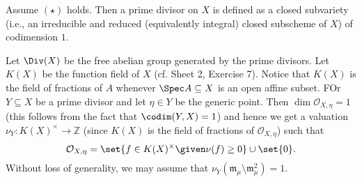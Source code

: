 Assume $(\star)$ holds. Then a prime divisor on $X$ is defined as a closed subvariety
(i.e., an irreducible and reduced (equivalently integral) closed subscheme of $X$)
of codimension $1$.

Let $\Div(X)$ be the free abelian group generated by the prime divisors. Let
$K(X)$ be the function field of $X$ (cf. Sheet 2, Exercise 7). Notice that
$K(X)$ is the field of fractions of $A$ whenever $\Spec A \subseteq X$ is an
open affine subset. FOr $Y \subseteq X$ be a prime divisor and let $\eta \in Y$
be the generic point. Then $\dim \mathcal{O}_{X, \eta} = 1$ (this follows from
the fact that $\codim(Y, X) = 1$) and hence we get a valuation
$\nu_Y\colon K(X)^\times \to \mathbb{Z}$ (since $K(X)$ is the field of fractions of
$\mathcal{O}_{X, \eta}$) such that
\[ \mathcal{O}_{X, \eta} = \set{f \in K(X)^\times\given \nu(f)\geq 0}\cup\set{0}. \]
Without loss of generality, we may assume that $\nu_Y(\mathfrak{m}_\mu\setminus \mathfrak{m}_\mu^2) = 1$.
